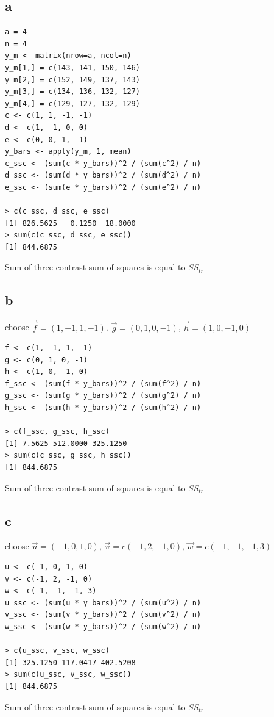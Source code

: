 \documentclass[11pt,letterpaper]{article}
\begin{document}
\subsection*{a}
\begin{verbatim}
a = 4
n = 4
y_m <- matrix(nrow=a, ncol=n)
y_m[1,] = c(143, 141, 150, 146)
y_m[2,] = c(152, 149, 137, 143)
y_m[3,] = c(134, 136, 132, 127)
y_m[4,] = c(129, 127, 132, 129)
c <- c(1, 1, -1, -1)
d <- c(1, -1, 0, 0)
e <- c(0, 0, 1, -1)
y_bars <- apply(y_m, 1, mean)
c_ssc <- (sum(c * y_bars))^2 / (sum(c^2) / n)
d_ssc <- (sum(d * y_bars))^2 / (sum(d^2) / n)
e_ssc <- (sum(e * y_bars))^2 / (sum(e^2) / n)

> c(c_ssc, d_ssc, e_ssc)
[1] 826.5625   0.1250  18.0000
> sum(c(c_ssc, d_ssc, e_ssc))
[1] 844.6875
\end{verbatim}
\noindent Sum of three contrast sum of squares is equal to $SS_{tr}$

\subsection*{b}
\noindent choose $\vec{f} = (1, -1, 1, -1)$, $\vec{g} = (0, 1, 0, -1) $, $\vec{h} = (1, 0, -1, 0)$
\begin{verbatim}
f <- c(1, -1, 1, -1)
g <- c(0, 1, 0, -1) 
h <- c(1, 0, -1, 0)
f_ssc <- (sum(f * y_bars))^2 / (sum(f^2) / n)
g_ssc <- (sum(g * y_bars))^2 / (sum(g^2) / n)
h_ssc <- (sum(h * y_bars))^2 / (sum(h^2) / n)

> c(f_ssc, g_ssc, h_ssc)
[1] 7.5625 512.0000 325.1250
> sum(c(c_ssc, g_ssc, h_ssc))
[1] 844.6875
\end{verbatim}
\noindent Sum of three contrast sum of squares is equal to $SS_{tr}$

\subsection*{c}
\noindent choose $\vec{u} = (-1, 0, 1, 0)$, $\vec{v} = c(-1, 2, -1, 0)$, $\vec{w} = c(-1, -1, -1, 3)$
\begin{verbatim}
u <- c(-1, 0, 1, 0)
v <- c(-1, 2, -1, 0)
w <- c(-1, -1, -1, 3)
u_ssc <- (sum(u * y_bars))^2 / (sum(u^2) / n)
v_ssc <- (sum(v * y_bars))^2 / (sum(v^2) / n)
w_ssc <- (sum(w * y_bars))^2 / (sum(w^2) / n)

> c(u_ssc, v_ssc, w_ssc)
[1] 325.1250 117.0417 402.5208
> sum(c(u_ssc, v_ssc, w_ssc))
[1] 844.6875
\end{verbatim}
\noindent Sum of three contrast sum of squares is equal to $SS_{tr}$
\end{document}
